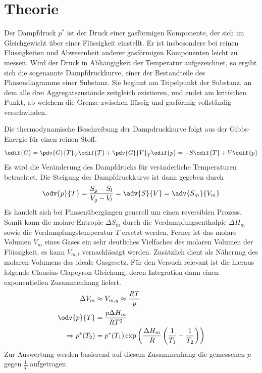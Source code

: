 \section{Theorie}
Der Dampfdruck $p^*$ ist der Druck einer gasförmigen Komponente, der sich im Gleichgewicht über einer Flüssigkeit einstellt.
Er ist insbesondere bei reinen Flüssigkeiten und Abwesenheit anderer gasförmigen Komponenten leicht zu messen.
Wird der Druck in Abhängigkeit der Temperatur aufgezeichnet, so ergibt sich die sogenannte Dampfdruckkurve, einer der Bestandteile des Phasendiagramms einer Substanz.
Sie beginnt am Tripelpunkt der Substanz, an dem alle drei Aggregatszustände zeitgleich existieren, und endet am kritischen Punkt, ab welchem die Grenze zwischen flüssig und gasförmig vollständig verschwinden.

Die thermodynamische Beschreibung der Dampdruckkurve folgt aus der Gibbs-Energie für einen reinen Stoff.
\begin{equation*}
    \odif{G} = \pdv{G}{T}_{V} \odif{T} + \pdv{G}{V}_{T} \odif{p} = - S\odif{T} + V\odif{p}
\end{equation*}
Es wird die Veränderung des Dampfdrucks für veränderliche Temperaturen betrachtet.
Die Steigung der Dampfdruckkurve ist dann gegeben durch
\begin{equation*}
    \odv{p}{T} = \frac{S_g - S_l}{V_g - V_l} = \adv{S}{V} = \adv{S_m}{V_m}
\end{equation*}
Es handelt sich bei Phasenübergängen generell um einen reversiblen Prozess. Somit kann die molare Entropie $\Delta S_m$ durch die Verdampfungsenthalpie $\Delta H_m$ sowie die Verdampfungstemperatur $T$ ersetzt werden.
Ferner ist das molare Volumen $V_m$ eines Gases ein sehr deutliches Vielfaches des molaren Volumen der Flüssigkeit, es kann $V_{m,l}$ vernachlässigt werden.
Zusätzlich dient als Näherung des molaren Volumens das ideale Gasgesetz.
Für den Versuch relevant ist die hieraus folgende Clausius-Clapeyron-Gleichung, deren Integration dann einen exponentiellen Zusammenhang liefert.
\begin{align}
    \Delta V_m &\approx V_{m,g} \approx \frac{RT}{p} \nonumber \\
    \odv{p}{T} &= \frac{p \Delta H_m}{RT^2} \nonumber \\
    \Rightarrow p^*(T_2) &= p^*(T_1) \exp\left( \frac{\Delta H_m}{R}\left( \frac{1}{T_1} - \frac{1}{T_2} \right) \right) \label{eqn:clausius-clapeyron}
\end{align}
Zur Auswertung werden basierend auf diesem Zusammenhang die gemessenen $p$ gegen $\frac{1}{T}$ aufgetragen.


